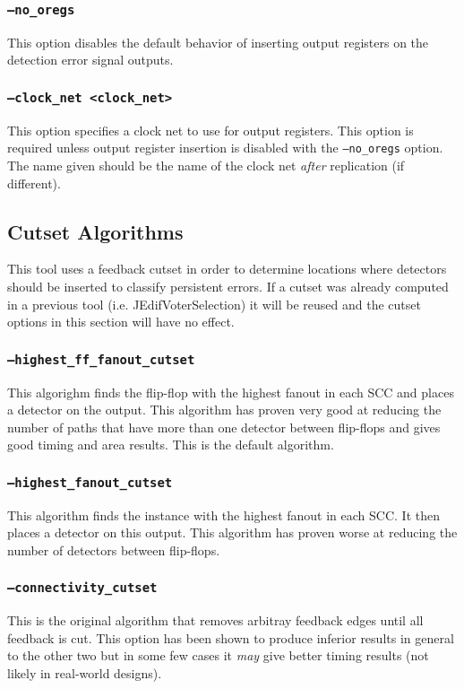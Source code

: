 \subsubsection{\texttt{--no\_oregs}}
This option disables the default behavior of inserting output registers on the
detection error signal outputs.

\subsubsection{\texttt{--clock\_net <clock\_net>}}
This option specifies a clock net to use for output registers. This option is
required unless output register insertion is disabled with the
\texttt{--no\_oregs} option. The name given should be the name of the clock net
\emph{after} replication (if different).

\subsection{Cutset Algorithms}
This tool uses a feedback cutset in order to determine locations where
detectors should be inserted to classify persistent errors. If a cutset was
already computed in a previous tool (i.e. JEdifVoterSelection) it will be
reused and the cutset options in this section will have no effect.

\subsubsection{\texttt{--highest\_ff\_fanout\_cutset}}
This algorighm finds the flip-flop with the highest fanout in each SCC and 
places a detector on the output. This algorithm has proven very good at reducing 
the number of paths that have more than one detector between flip-flops and
gives good timing and area results. This is the default algorithm.

\subsubsection{\texttt{--highest\_fanout\_cutset}}
This algorithm finds the instance with the highest fanout in each SCC.
It then places a detector on this output. This algorithm has proven worse 
at reducing the number of detectors between flip-flops.

\subsubsection{\texttt{--connectivity\_cutset}}
This is the original algorithm that removes arbitray feedback edges until all
feedback is cut. This option has been shown to produce inferior results in
general to the other two but in some few cases it \emph{may} give better timing
results (not likely in real-world designs).

